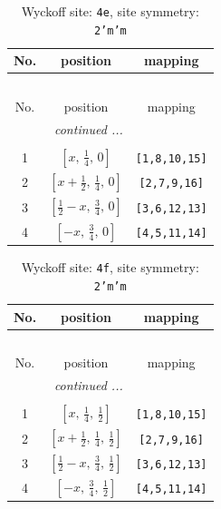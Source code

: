 \documentclass[fleqn,8pt]{jsarticle}
\begin{document}
\renewcommand{\arraystretch}{1.2}
\begin{longtable}{ccc}
\caption{Wyckoff site: {\tt 4e}, site symmetry: {\tt 2'm'm}}
 \\
 \hline \hline
No. & position & mapping \\ \hline \endfirsthead

\multicolumn{2}{l}{\tablename\ \thetable{}} \\
 \hline \hline
No. & position & mapping \\ \hline \endhead

 \hline \hline
\multicolumn{2}{r}{\footnotesize\it continued ...} \\ \endfoot

 \hline \hline
\multicolumn{2}{r}{} \\ \endlastfoot

1 & $\left[ x,\, \frac{1}{4},\, 0 \right]$ & {\tt [1,8,10,15]} \\ \hline
2 & $\left[ x + \frac{1}{2},\, \frac{1}{4},\, 0 \right]$ & {\tt [2,7,9,16]} \\ \hline
3 & $\left[ \frac{1}{2} - x,\, \frac{3}{4},\, 0 \right]$ & {\tt [3,6,12,13]} \\ \hline
4 & $\left[ - x,\, \frac{3}{4},\, 0 \right]$ & {\tt [4,5,11,14]} \\
\end{longtable}
\renewcommand{\arraystretch}{1.2}
\begin{longtable}{ccc}
\caption{Wyckoff site: {\tt 4f}, site symmetry: {\tt 2'm'm}}
 \\
 \hline \hline
No. & position & mapping \\ \hline \endfirsthead

\multicolumn{2}{l}{\tablename\ \thetable{}} \\
 \hline \hline
No. & position & mapping \\ \hline \endhead

 \hline \hline
\multicolumn{2}{r}{\footnotesize\it continued ...} \\ \endfoot

 \hline \hline
\multicolumn{2}{r}{} \\ \endlastfoot

1 & $\left[ x,\, \frac{1}{4},\, \frac{1}{2} \right]$ & {\tt [1,8,10,15]} \\ \hline
2 & $\left[ x + \frac{1}{2},\, \frac{1}{4},\, \frac{1}{2} \right]$ & {\tt [2,7,9,16]} \\ \hline
3 & $\left[ \frac{1}{2} - x,\, \frac{3}{4},\, \frac{1}{2} \right]$ & {\tt [3,6,12,13]} \\ \hline
4 & $\left[ - x,\, \frac{3}{4},\, \frac{1}{2} \right]$ & {\tt [4,5,11,14]} \\
\end{longtable}
\end{document}
